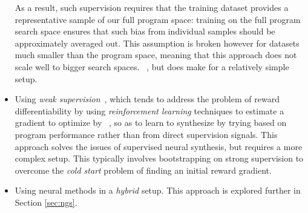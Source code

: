 \documentclass{article}
\begin{document}
\begin{itemize}
{            As a result, such supervision requires that the training dataset provides a representative sample of our full program space:
            training on the full program search space ensures that such bias from individual samples should be approximately averaged out.
            This assumption is broken however for datasets much smaller than the program space,
            meaning that this approach does not scale well to bigger search spaces.~\citep{nsps}
        }, but does make for a relatively simple setup.
    \item Using \emph{weak supervision}~\citep{mapo},
        which tends to address the problem of reward differentiability by using \emph{reinforcement learning} techniques to estimate a gradient to optimize by%
        ~\citep{chen2017towards,bunel2018leveraging,xu2019neural,camacho2019towards},
        so as to learn to synthesize by trying based on program performance rather than from direct supervision signals.
        This approach solves the issues of supervised neural synthesis,
        but requires a more complex setup.
        This typically involves bootstrapping on strong supervision to overcome the \emph{cold start} problem of finding an initial reward gradient.
    \item Using neural methods in a \emph{hybrid} setup. This approach is explored further in Section \ref{sec:ngs}.
\end{itemize}



\end{document}
